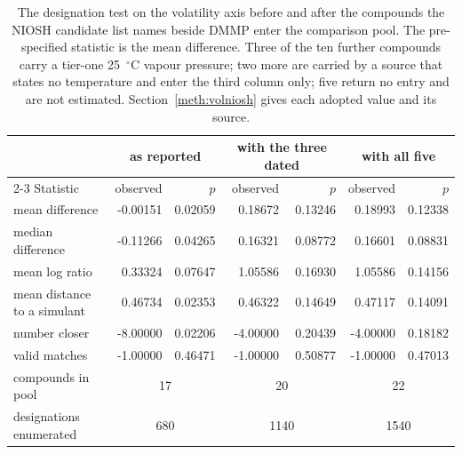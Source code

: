 \begin{table}[htb]
\centering
\caption{The designation test on the volatility axis before and after the compounds the NIOSH candidate list names beside DMMP enter the comparison pool. The pre-specified statistic is the mean difference. Three of the ten further compounds carry a tier-one 25~$^{\circ}$C vapour pressure; two more are carried by a source that states no temperature and enter the third column only; five return no entry and are not estimated. Section~\ref{meth:volniosh} gives each adopted value and its source.}
\label{tab:volniosh}
\footnotesize
\setlength{\tabcolsep}{3pt}
\begin{tabular}{lrrrrrr}
\hline
 & \multicolumn{2}{c}{as reported} & \multicolumn{2}{c}{with the three dated} & \multicolumn{2}{c}{with all five} \\
\cline{2-3}\cline{4-5}\cline{6-7}
Statistic & observed & $p$ & observed & $p$ & observed & $p$ \\
\hline
mean difference & -0.00151 & 0.02059 & 0.18672 & 0.13246 & 0.18993 & 0.12338 \\
median difference & -0.11266 & 0.04265 & 0.16321 & 0.08772 & 0.16601 & 0.08831 \\
mean log ratio & 0.33324 & 0.07647 & 1.05586 & 0.16930 & 1.05586 & 0.14156 \\
mean distance to a simulant & 0.46734 & 0.02353 & 0.46322 & 0.14649 & 0.47117 & 0.14091 \\
number closer & -8.00000 & 0.02206 & -4.00000 & 0.20439 & -4.00000 & 0.18182 \\
valid matches & -1.00000 & 0.46471 & -1.00000 & 0.50877 & -1.00000 & 0.47013 \\
\hline
compounds in pool & \multicolumn{2}{c}{17} & \multicolumn{2}{c}{20} & \multicolumn{2}{c}{22} \\
designations enumerated & \multicolumn{2}{c}{680} & \multicolumn{2}{c}{1140} & \multicolumn{2}{c}{1540} \\
\hline
\end{tabular}
\end{table}
